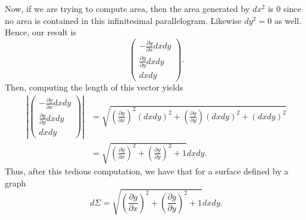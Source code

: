                                     Now, if we are trying to compute area, then the area generated by $dx^2$ is 0 since no area is contained in this infinitesimal parallelogram. Likewise $dy^2=0$ as well. Hence, our result is
                                    \[
                                    \begin{pmatrix} -\frac{\partial g}{\partial x} dxdy \\ \frac{\partial g}{\partial y} dxdy \\ dxdy \end{pmatrix}.
                                    \]
                                    Then, computing the length of this vector yields
                                     \begin{align*}
                                     \left| \begin{pmatrix} -\frac{\partial g}{\partial x} dxdy \\ \frac{\partial g}{\partial y} dxdy \\ dxdy \end{pmatrix}\right| &= \sqrt{ \left( \frac{\partial g}{\partial x}  \right)^2 (dxdy)^2 + \left( \frac{\partial g}{\partial y} \right) (dxdy)^2 + (dxdy)^2}\\
                                     &= \sqrt{\left(\frac{\partial g}{\partial x} \right)^2 + \left( \frac{\partial g}{\partial y}  \right)^2 +1 } dxdy.
                					\end{align*}
                					Thus, after this tedious computation, we have that for a surface defined by a graph 
                					\[
                					d\Sigma = \sqrt{\left(\frac{\partial g}{\partial x} \right)^2 + \left( \frac{\partial g}{\partial y}  \right)^2 +1 } dxdy.
                					\]
                                     
